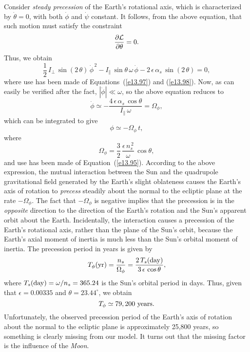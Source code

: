 Consider {\em steady precession}\/ of the Earth's rotational axis, which is characterized by $\dot{\theta}=0$, with  both $\dot{\phi}$  and $\dot{\psi}$ constant. It follows, from the above equation, that
such motion must satisfy the constraint
\begin{equation}
\frac{\partial {\cal L}}{\partial\theta} = 0.
\end{equation}
Thus, we obtain
\begin{equation}
\frac{1}{2}\,I_\perp\,\sin(2\,\theta)\,\dot{\phi}^{\,2} - I_\parallel\,\sin\theta\,\omega\,\dot{\phi} - 2\,\epsilon\,\alpha_s\,\sin(2\,\theta) = 0,
\end{equation}
where use has been made of Equations~(\ref{e13.97}) and (\ref{e13.98}).
Now, as can easily be verified after the fact, $|\dot{\phi}|\ll \omega$, so the above equation reduces to
\begin{equation}
\dot{\phi} \simeq
-\frac{4\,\epsilon\,\alpha_s\,\cos\theta}{I_{\parallel}\,\omega} = \Omega_\phi,
\end{equation}
which can be integrated to give
\begin{equation}
\phi \simeq- \Omega_\phi\,t,
\end{equation}
where
\begin{equation}
\Omega_\phi = \frac{3}{2}\,\frac{\epsilon\,n_s^{\,2}}{\omega}\,\cos\theta,
\end{equation}
and use has been made of Equation~(\ref{e13.95}).
According to the above expression, the mutual interaction between the Sun and
the quadrupole gravitational field generated by the Earth's slight oblateness causes
the Earth's axis of rotation to {\em precess}\/ steadily about the normal to the ecliptic
plane at the rate $-\Omega_\phi$. The fact that $-\Omega_\phi$ is
negative implies that the precession is in the {\em opposite}\/ direction
to the direction of  the Earth's rotation and the Sun's apparent orbit about the Earth. Incidentally,  the interaction causes a precession
of the Earth's rotational axis, rather than the plane of the Sun's orbit,
 because  the Earth's axial moment of inertia is much less than
 the Sun's orbital moment of inertia.
The precession period in years is given by
\begin{equation}
T_\phi({\rm yr}) = \frac{n_s}{\Omega_\phi} = \frac{2\,T_s({\rm day})}{3\,\epsilon\,\cos\theta},
\end{equation}
where $T_s({\rm day}) = \omega/n_s = 365.24$ is
the Sun's orbital period in days. Thus, given that $\epsilon=0.00335$ and
$\theta = 23.44^\circ$, we obtain
\begin{equation}
T_\phi\simeq 79,200\,\,{\rm years}.
\end{equation}
Unfortunately, the observed precession period of the Earth's axis of rotation about the normal to the ecliptic plane is   approximately 25,800 years, so something is clearly missing from
our model. It turns out that the missing factor is the influence of the {\em Moon}.

